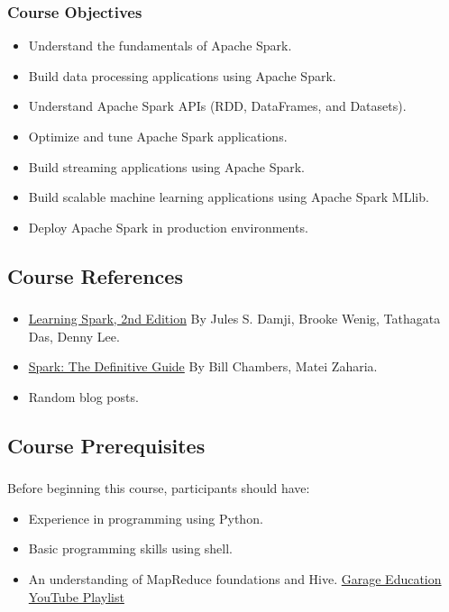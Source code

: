 \begin{frame}
    \frametitle{Course Objectives}

    \begin{itemize}
        \item Understand the fundamentals of Apache Spark.
        \item Build data processing applications using Apache Spark.
        \item Understand Apache Spark APIs (RDD, DataFrames, and Datasets).
        \item Optimize and tune Apache Spark applications.
        \item Build streaming applications using Apache Spark.
        \item Build scalable machine learning applications using Apache Spark MLlib.
        \item Deploy Apache Spark in production environments.
    \end{itemize}

\end{frame}


\subsection{Course References}\label{subsec:course-references}
\begin{frame}
    \frametitle{\subsecname}
    \begin{itemize}
        \item \href{https://pages.databricks.com/rs/094-YMS-629/images/LearningSpark2.0.pdf}{Learning Spark, 2nd Edition} By Jules S. Damji, Brooke Wenig, Tathagata Das, Denny Lee.
        \item \href{https://learning.oreilly.com/library/view/spark-the-definitive/9781491912201/}{Spark: The Definitive Guide} By Bill Chambers, Matei Zaharia.
        \item Random blog posts.
    \end{itemize}
\end{frame}

\subsection{Course Prerequisites}\label{subsec:course-prerequisites}
\begin{frame}
    \frametitle{\subsecname}
    Before beginning this course, participants should have:
    \begin{itemize}
        \item Experience in programming using Python.
        \item Basic programming skills using shell.
        \item An understanding of MapReduce foundations and Hive. \href{https://www.youtube.com/playlist?list=PLxNoJq6k39G8Ak39PDC-oYvp6ZRvIn3Pa}{Garage Education YouTube Playlist}
    \end{itemize}

\end{frame}

